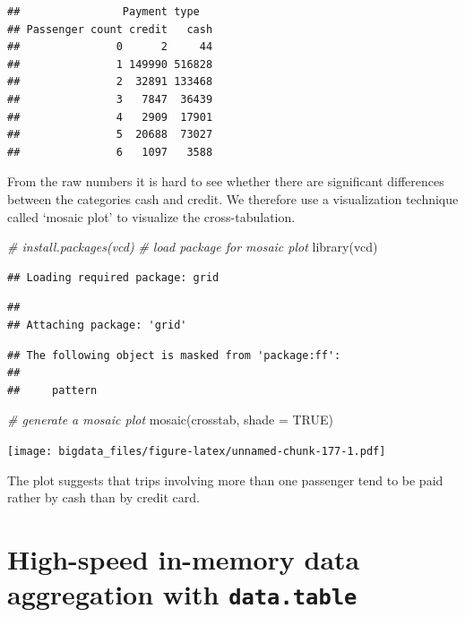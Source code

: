 \documentclass[
  12pt,
]{style/krantz}
\newenvironment{Shaded}{\begin{snugshade}}{\end{snugshade}}
\newcommand{\AttributeTok}[1]{\textcolor[rgb]{0.77,0.63,0.00}{#1}}
\newcommand{\CommentTok}[1]{\textcolor[rgb]{0.56,0.35,0.01}{\textit{#1}}}
\newcommand{\ConstantTok}[1]{\textcolor[rgb]{0.00,0.00,0.00}{#1}}
\newcommand{\FunctionTok}[1]{\textcolor[rgb]{0.00,0.00,0.00}{#1}}
\newcommand{\NormalTok}[1]{#1}
\begin{document}
\begin{verbatim}
##                Payment type
## Passenger count credit   cash
##               0      2     44
##               1 149990 516828
##               2  32891 133468
##               3   7847  36439
##               4   2909  17901
##               5  20688  73027
##               6   1097   3588
\end{verbatim}

From the raw numbers it is hard to see whether there are significant differences between the categories cash and credit. We therefore use a visualization technique called `mosaic plot' to visualize the cross-tabulation.

\begin{Shaded}
\begin{Highlighting}[]
\CommentTok{\# install.packages(vcd)}
\CommentTok{\# load package for mosaic plot}
\FunctionTok{library}\NormalTok{(vcd)}
\end{Highlighting}
\end{Shaded}

\begin{verbatim}
## Loading required package: grid
\end{verbatim}

\begin{verbatim}
## 
## Attaching package: 'grid'
\end{verbatim}

\begin{verbatim}
## The following object is masked from 'package:ff':
## 
##     pattern
\end{verbatim}

\begin{Shaded}
\begin{Highlighting}[]
\CommentTok{\# generate a mosaic plot}
\FunctionTok{mosaic}\NormalTok{(crosstab, }\AttributeTok{shade =} \ConstantTok{TRUE}\NormalTok{)}
\end{Highlighting}
\end{Shaded}

\texttt{[image: bigdata\_files/figure-latex/unnamed-chunk-177-1.pdf]}

The plot suggests that trips involving more than one passenger tend to be paid rather by cash than by credit card.

\hypertarget{high-speed-in-memory-data-aggregation-with-data.table}{%
\section{\texorpdfstring{High-speed in-memory data aggregation with \texttt{data.table}}{High-speed in-memory data aggregation with data.table}}\label{high-speed-in-memory-data-aggregation-with-data.table}}
\end{document}
